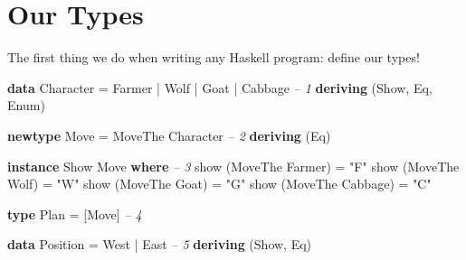 \documentclass[]{article}
\newenvironment{Shaded}{}{}
\newcommand{\KeywordTok}[1]{\textcolor[rgb]{0.00,0.44,0.13}{\textbf{{#1}}}}
\newcommand{\DataTypeTok}[1]{\textcolor[rgb]{0.56,0.13,0.00}{{#1}}}
\newcommand{\StringTok}[1]{\textcolor[rgb]{0.25,0.44,0.63}{{#1}}}
\newcommand{\CommentTok}[1]{\textcolor[rgb]{0.38,0.63,0.69}{\textit{{#1}}}}
\newcommand{\FunctionTok}[1]{\textcolor[rgb]{0.02,0.16,0.49}{{#1}}}
\newcommand{\NormalTok}[1]{{#1}}
\begin{document}
\section{Our Types}\label{our-types}

The first thing we do when writing any Haskell program: define our types!

\begin{Shaded}
\begin{Highlighting}[]
\KeywordTok{data} \DataTypeTok{Character} \FunctionTok{=} \DataTypeTok{Farmer} \FunctionTok{|} \DataTypeTok{Wolf} \FunctionTok{|} \DataTypeTok{Goat} \FunctionTok{|} \DataTypeTok{Cabbage} \CommentTok{-- 1}
        \KeywordTok{deriving} \NormalTok{(}\DataTypeTok{Show}\NormalTok{, }\DataTypeTok{Eq}\NormalTok{, }\DataTypeTok{Enum}\NormalTok{)}

\KeywordTok{newtype} \DataTypeTok{Move} \FunctionTok{=} \DataTypeTok{MoveThe} \DataTypeTok{Character}                \CommentTok{-- 2}
        \KeywordTok{deriving} \NormalTok{(}\DataTypeTok{Eq}\NormalTok{)}

\KeywordTok{instance} \DataTypeTok{Show} \DataTypeTok{Move} \KeywordTok{where}                        \CommentTok{-- 3}
    \NormalTok{show (}\DataTypeTok{MoveThe} \DataTypeTok{Farmer}\NormalTok{)  }\FunctionTok{=} \StringTok{"F"}
    \NormalTok{show (}\DataTypeTok{MoveThe} \DataTypeTok{Wolf}\NormalTok{)    }\FunctionTok{=} \StringTok{"W"}
    \NormalTok{show (}\DataTypeTok{MoveThe} \DataTypeTok{Goat}\NormalTok{)    }\FunctionTok{=} \StringTok{"G"}
    \NormalTok{show (}\DataTypeTok{MoveThe} \DataTypeTok{Cabbage}\NormalTok{) }\FunctionTok{=} \StringTok{"C"}

\KeywordTok{type} \DataTypeTok{Plan} \FunctionTok{=} \NormalTok{[}\DataTypeTok{Move}\NormalTok{]                              }\CommentTok{-- 4}

\KeywordTok{data} \DataTypeTok{Position} \FunctionTok{=} \DataTypeTok{West} \FunctionTok{|} \DataTypeTok{East}                     \CommentTok{-- 5}
    \KeywordTok{deriving} \NormalTok{(}\DataTypeTok{Show}\NormalTok{, }\DataTypeTok{Eq}\NormalTok{)}
\end{Highlighting}
\end{Shaded}
\end{document}
